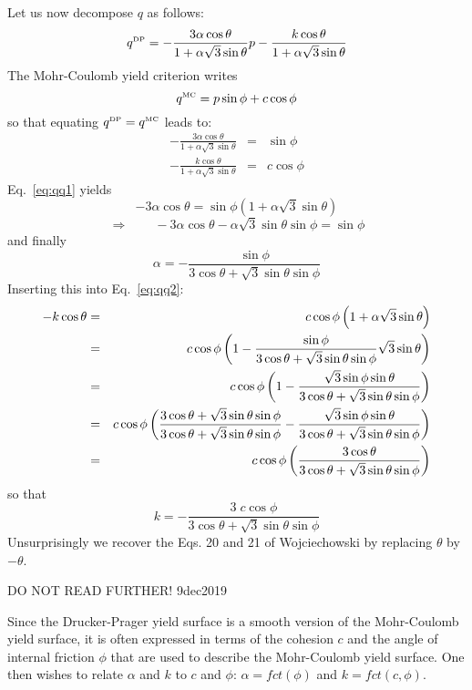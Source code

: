 Let us now decompose $q$ as follows:
\[
q^{\text{\tiny DP}} = -\frac{3 \alpha \cos\theta}{1 + \alpha \sqrt{3}\sin\theta} p 
-\frac{k\cos\theta}{1 + \alpha \sqrt{3}\sin\theta}
\]
The Mohr-Coulomb yield criterion writes
\[
q^{\text{\tiny MC}} = p \sin\phi + c \cos\phi
\]
so that equating $q^{\text{\tiny DP}}=q^{\text{\tiny MC}}$ leads to:
\begin{eqnarray}
-\frac{3 \alpha \cos\theta}{1 + \alpha \sqrt{3}\sin\theta} &=& \sin\phi \label{eq:qq1}\\
-\frac{k\cos\theta}{1 + \alpha \sqrt{3}\sin\theta} &=& c \cos\phi \label{eq:qq2}
\end{eqnarray}
Eq.~\ref{eq:qq1} yields
\[
- 3 \alpha \cos\theta = \sin\phi (1 + \alpha \sqrt{3}\sin\theta) 
\]
\[
\Rightarrow \qquad - 3 \alpha \cos\theta - \alpha \sqrt{3}\sin\theta \sin\phi = \sin\phi 
\]
and finally 
\[
\boxed{
\alpha = - \frac{\sin\phi}{ 3 \cos\theta + \sqrt{3}\sin\theta \sin\phi}
}
\]
Inserting this into Eq.~\ref{eq:qq2}:
\begin{eqnarray}
- k \cos\theta 
&=& c \cos \phi \left(1 +\alpha \sqrt{3} \sin\theta \right)  \nonumber\\
&=& c \cos \phi \left(1 - \frac{\sin\phi}{ 3 \cos\theta + \sqrt{3}\sin\theta \sin\phi}  \sqrt{3} \sin\theta\right) \nonumber\\
&=& c \cos \phi \left(1 - 
\frac{ \sqrt{3}\sin\phi \sin\theta }{ 3 \cos\theta + \sqrt{3}\sin\theta \sin\phi} \right) \nonumber\\
&=& c \cos \phi \left(
\frac{ 3 \cos\theta + \sqrt{3}\sin\theta \sin\phi}{ 3 \cos\theta + \sqrt{3}\sin\theta \sin\phi} 
 - 
\frac{ \sqrt{3}\sin\phi \sin\theta }{ 3 \cos\theta + \sqrt{3}\sin\theta \sin\phi} \right) \nonumber\\
&=& c \cos \phi \left(
\frac{ 3 \cos\theta}{ 3 \cos\theta + \sqrt{3}\sin\theta \sin\phi} \right) \nonumber
\end{eqnarray}
so that 
\[
\boxed{
k =- \frac{ 3\; c \cos \phi }{ 3 \cos\theta + \sqrt{3}\sin\theta \sin\phi} 
}
\]
Unsurprisingly we recover the Eqs. 20 and 21 of Wojciechowski \cite{wojc18} by replacing $\theta$ by $-\theta$.




\newpage

DO NOT READ FURTHER! 9dec2019

Since the Drucker-Prager yield surface is a smooth version of the Mohr-Coulomb yield surface, it 
is often expressed in terms of the cohesion $c$ and the angle of internal friction $\phi$ that are used 
to describe the Mohr-Coulomb yield surface. One then wishes to relate $\alpha$ and $k$ to $c$ and $\phi$:
$\alpha= fct(\phi)$ and $k= fct(c,\phi) $.

